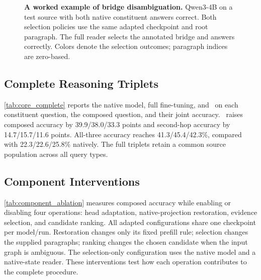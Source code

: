 \begin{figure}[!htbp]
  \centering
  \begin{minipage}{.68\textwidth}\centering
  \par
  \caption{\textbf{A worked example of bridge disambiguation.} Qwen3-4B on a test source with both native constituent answers correct. Both selection policies use the same adapted checkpoint and root paragraph. The full reader selects the annotated bridge and answers correctly. Colors denote the selection outcomes; paragraph indices are zero-based.}
  \label{fig:case_main}
\end{minipage}
\end{figure}

\subsection{Complete Reasoning Triplets}

\cref{tab:core_complete} reports the native model, full fine-tuning, and \method\ on each constituent question, the composed question, and their joint accuracy. \method\ raises composed accuracy by 39.9/38.0/33.3 points and second-hop accuracy by 14.7/15.7/11.6 points. All-three accuracy reaches 41.3/45.4/42.3\%, compared with 22.3/22.6/25.8\% natively. The full triplets retain a common source population across all query types.

\begin{table}[!htbp]
  \centering
  \caption{\textbf{Complete contextual reasoning results.} Completed-answer EM (\%) on all 1,000 sources per query type. ``All three'' requires a source's composed, first-hop, and second-hop answers to be correct. Values are mean $\pm$ sample SD over three recorded runs; Native is measured once.}
  \label{tab:core_complete}
  \small\setlength{\tabcolsep}{4pt}
  
\end{table}

\subsection{Component Interventions}
\label{app:components}

\cref{tab:component_ablation} measures composed accuracy while enabling or disabling four operations: head adaptation, native-projection restoration, evidence selection, and candidate ranking. All adapted configurations share one checkpoint per model/run. Restoration changes only its fixed prefill rule; selection changes the supplied paragraphs; ranking changes the chosen candidate when the input graph is ambiguous. The selection-only configuration uses the native model and a native-state reader. These interventions test how each operation contributes to the complete procedure.

